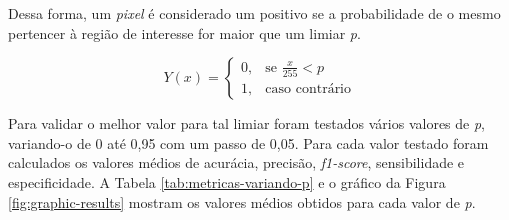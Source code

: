 Dessa forma, um \textit{pixel} é considerado um positivo se a probabilidade de o mesmo pertencer à região de interesse for maior que um limiar \textit{p}.

\begin{equation}
Y(x) = \left \{ \begin{matrix} 0, & \mbox{se } \frac{x}{255} < p
\\ 1, & \mbox{caso contrário} \end{matrix} \right. 
\label{eq-prob-threshold}
\end{equation}

Para validar o melhor valor para tal limiar foram testados vários valores de \textit{p}, variando-o de 0 até 0,95 com um passo de 0,05. Para cada valor testado foram calculados os valores médios de acurácia, precisão, \textit{f1-score}, sensibilidade e especificidade. A Tabela \ref{tab:metricas-variando-p} e o gráfico da Figura \ref{fig:graphic-results} mostram os valores médios obtidos para cada valor de \textit{p}.

